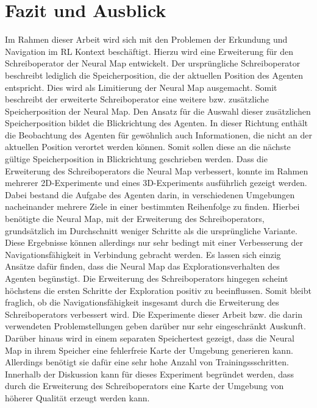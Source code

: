 \chapter{Fazit und Ausblick}

Im Rahmen dieser Arbeit wird sich mit den Problemen der Erkundung und Navigation im RL Kontext beschäftigt. Hierzu wird eine Erweiterung für den Schreiboperator der Neural Map entwickelt. Der ursprüngliche Schreiboperator beschreibt lediglich die Speicherposition, die der aktuellen Position des Agenten entspricht. Dies wird als Limitierung der Neural Map ausgemacht. Somit beschreibt der erweiterte Schreiboperator eine weitere bzw. zusätzliche Speicherposition der Neural Map. Den Ansatz für die Auswahl dieser zusätzlichen Speicherposition bildet die Blickrichtung des Agenten. In dieser Richtung enthält die Beobachtung des Agenten für gewöhnlich auch Informationen, die nicht an der aktuellen Position verortet werden können. Somit sollen diese an die nächste gültige Speicherposition in Blickrichtung geschrieben werden. Dass die Erweiterung des Schreiboperators die Neural Map verbessert, konnte im Rahmen mehrerer 2D-Experimente und eines 3D-Experiments ausführlich gezeigt werden. Dabei bestand die Aufgabe des Agenten darin, in verschiedenen Umgebungen nacheinander mehrere Ziele in einer bestimmten Reihenfolge zu finden. Hierbei benötigte die Neural Map, mit der Erweiterung des Schreiboperators, grundsätzlich im Durchschnitt weniger Schritte als die ursprüngliche Variante. Diese Ergebnisse können allerdings nur sehr bedingt mit einer Verbesserung der Navigationsfähigkeit in Verbindung gebracht werden. Es lassen sich einzig Ansätze dafür finden, dass die Neural Map das Explorationsverhalten des Agenten begünstigt. Die Erweiterung des Schreiboperators hingegen scheint höchstens die ersten Schritte der Exploration positiv zu beeinflussen. Somit bleibt fraglich, ob die Navigationsfähigkeit insgesamt durch die Erweiterung des Schreiboperators verbessert wird. Die Experimente dieser Arbeit bzw. die darin verwendeten Problemstellungen geben darüber nur sehr eingeschränkt Auskunft. Darüber hinaus wird in einem separaten Speichertest gezeigt, dass die Neural Map in ihrem Speicher eine fehlerfreie Karte der Umgebung generieren kann. Allerdings benötigt sie dafür eine sehr hohe Anzahl von Trainingssschritten. Innerhalb der Diskussion kann für dieses Experiment begründet werden, dass durch die Erweiterung des Schreiboperators eine Karte der Umgebung von höherer Qualität erzeugt werden kann.

